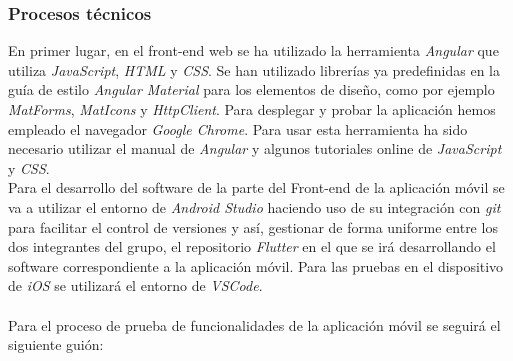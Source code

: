 \documentclass{article}
\begin{document}
\subsubsection{Procesos técnicos}
En primer lugar, en el front-end web se ha utilizado la herramienta \textit{Angular} que utiliza \textit{JavaScript}, \textit{HTML} y \textit{CSS}. Se han utilizado librerías ya predefinidas en la guía de estilo \textit{Angular Material} para los elementos de diseño, como por ejemplo \textit{MatForms}, \textit{MatIcons} y \textit{HttpClient}. Para desplegar y probar la aplicación hemos empleado el navegador \textit{Google Chrome}.
Para usar esta herramienta ha sido necesario utilizar el manual de \textit{Angular} y algunos tutoriales online de \textit{JavaScript} y \textit{CSS}.\\
\hfill \break
Para el desarrollo del software de la parte del Front-end de la aplicación móvil se va a utilizar el entorno de \textit{Android Studio} haciendo uso de su integración con \textit{git} para facilitar el control de versiones y así, gestionar de forma uniforme entre los dos integrantes del grupo, el repositorio \textit{Flutter} en el que se irá desarrollando el software correspondiente a la aplicación móvil. Para las pruebas en el dispositivo de \textit{iOS} se utilizará el entorno de \textit{VSCode}.\\\\
Para el proceso de prueba de funcionalidades de la aplicación móvil se seguirá el siguiente guión:
\end{document}
